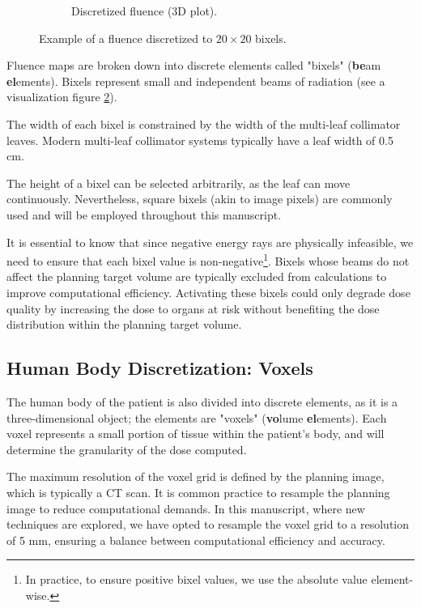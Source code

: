 \begin{figure}
\begin{subfigure}[c]{0.45\textwidth}
		\caption{Discretized fluence (3D plot).}
		\label{fig:fluence_bixel_3D_discrete}
	\end{subfigure}
	\caption{Example of a fluence discretized to $20 \times 20$ bixels.}
	\label{fig:fluence_bixel}
\end{figure}

Fluence maps are broken down into discrete elements called "bixels" (\textbf{be}am \textbf{el}ements).
Bixels represent small and independent beams of radiation (see a visualization figure \ref{fig:fluence_bixel}).

The width of each bixel is constrained by the width of the multi-leaf collimator leaves.
Modern multi-leaf collimator systems typically have a leaf width of 0.5 cm.

The height of a bixel can be selected arbitrarily, as the leaf can move continuously.
Nevertheless, square bixels (akin to image pixels) are commonly used and will be employed throughout this manuscript.

It is essential to know that since negative energy rays are physically infeasible, we need to ensure that each bixel value is non-negative\footnote{In practice, to ensure positive bixel values, we use the absolute value element-wise.}.
Bixels whose beams do not affect the planning target volume are typically excluded from calculations to improve computational efficiency.
Activating these bixels could only degrade dose quality by increasing the dose to organs at risk without benefiting the dose distribution within the planning target volume.

\subsection[Voxels]{Human Body Discretization: Voxels}
The human body of the patient is also divided into discrete elements, as it is a three-dimensional object; the elements are "voxels" (\textbf{vo}lume \textbf{el}ements).
Each voxel represents a small portion of tissue within the patient's body, and will determine the granularity of the dose computed.

The maximum resolution of the voxel grid is defined by the planning image, which is typically a CT scan.
It is common practice to resample the planning image to reduce computational demands.
In this manuscript, where new techniques are explored, we have opted to resample the voxel grid to a resolution of 5 mm, ensuring a balance between computational efficiency and accuracy.

